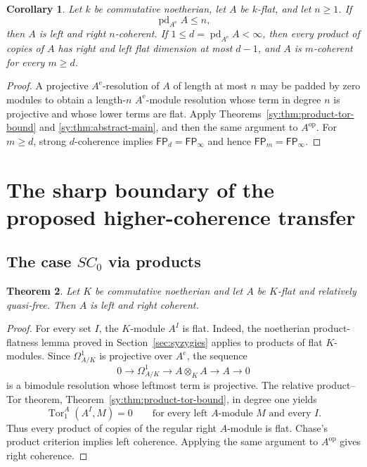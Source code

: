 \documentclass[11pt]{article}
\numberwithin{equation}{section}
\newtheorem{theorem}{Theorem}[section]
\newtheorem{corollary}[theorem]{Corollary}
\theoremstyle{definition}
\theoremstyle{remark}
\newcommand{\Tor}{\operatorname{Tor}}
\newcommand{\pd}{\operatorname{pd}}
\newcommand{\FP}{\mathsf{FP}}
\begin{document}
\begin{corollary}
\label{sy:cor:hoch-dim}
Let $k$ be commutative noetherian, let $A$ be $k$-flat, and let
$n\geq1$.  If
\[
\pd_{A^{\mathrm e}}A\leq n,
\]
then $A$ is left and right $n$-coherent.  If
$1\leq d=\pd_{A^{\mathrm e}}A<\infty$, then every product of copies of
$A$ has right and left flat dimension at most $d-1$, and $A$ is
$m$-coherent for every $m\geq d$.
\end{corollary}

\begin{proof}
A projective $A^{\mathrm e}$-resolution of $A$ of length at most $n$ may
be padded by zero modules to obtain a length-$n$ $A^{\mathrm e}$-module
resolution whose term in degree $n$ is projective and whose lower
terms are flat.  Apply Theorems~\ref{sy:thm:product-tor-bound} and
\ref{sy:thm:abstract-main}, and then the same argument to $A^{\mathrm{op}}$.
For $m\geq d$, strong $d$-coherence implies
$\FP_d=\FP_\infty$ and hence $\FP_m=\FP_\infty$.
\end{proof}

\section{The sharp boundary of the proposed higher-coherence transfer}\label{sec:sharp-boundary}

\subsection{The case \texorpdfstring{$SC_0$}{SC0} via products}

\begin{theorem}\label{sc:cor:SC0}
Let $K$ be commutative noetherian and let $A$ be $K$-flat and relatively
quasi-free.  Then $A$ is left and right coherent.
\end{theorem}
\begin{proof}
For every set $I$, the $K$-module $A^I$ is flat.  Indeed, the
noetherian product-flatness lemma proved in
Section~\ref{sec:syzygies} applies to products of flat $K$-modules.
Since $\Omega^1_{A/K}$ is projective over $A^e$, the sequence
\[
0\longrightarrow\Omega^1_{A/K}\longrightarrow A\otimes_K A
\longrightarrow A\longrightarrow0
\]
is a bimodule resolution whose leftmost term is projective.  The
relative product--Tor theorem,
Theorem~\ref{sy:thm:product-tor-bound}, in degree one yields
\[
\Tor_1^A(A^I,M)=0
\qquad\text{for every left $A$-module $M$ and every $I$.}
\]
Thus every product of copies of the regular right $A$-module is flat.
Chase's product criterion implies left coherence.  Applying the same
argument to $A^{\mathrm{op}}$ gives right coherence.
\end{proof}
\end{document}
